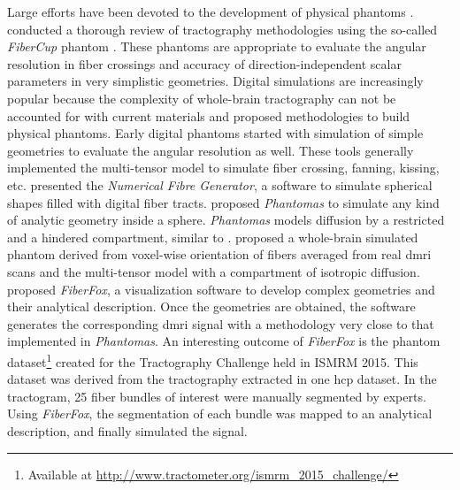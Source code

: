 \documentclass[english]{frontiers/frontiersSCNS} %
\begin{document}
Large efforts have been devoted to the development of physical phantoms
  \citep{lin_validation_2001,campbell_flowbased_2005,perrin_validation_2005,fieremans_simulation_2008,tournier_resolving_2008}.
\cite{cote_tractometer_2013} conducted a thorough review of tractography methodologies using the
  so-called \emph{FiberCup} phantom \citep{poupon_new_2008,fillard_quantitative_2011}.
These phantoms are appropriate to evaluate the angular resolution in fiber crossings and accuracy of
  direction-independent scalar parameters in very simplistic geometries.
Digital simulations are increasingly popular because the complexity of whole-brain tractography
  can not be accounted for with current materials and proposed methodologies to build physical phantoms.
Early digital phantoms started with simulation of simple geometries
  \citep{basser_in_2000,goessl_fiber_2002,tournier_limitations_2002,leemans_mathematical_2005}
  to evaluate the angular resolution as well.
These tools generally implemented the multi-tensor model \citep{alexander_analysis_2001,tuch_high_2002}
  to simulate fiber crossing, fanning, kissing, etc.
\cite{close_software_2009} presented the \emph{Numerical Fibre Generator}, a software to simulate
  spherical shapes filled with digital fiber tracts.
\cite{caruyer_phantomas_2014} proposed \emph{Phantomas} to simulate any kind of analytic geometry
  inside a sphere.
\emph{Phantomas} models diffusion by a restricted and a hindered compartment, similar to
  \citep{assaf_composite_2005}.
\cite{wilkins_fiber_2014} proposed a whole-brain simulated phantom derived from voxel-wise orientation
  of fibers averaged from real \gls*{dmri} scans and the multi-tensor model with a compartment of
  isotropic diffusion.
\cite{neher_fiberfox_2014} proposed \emph{FiberFox}, a visualization software to develop
  complex geometries and their analytical description.
Once the geometries are obtained, the software generates the corresponding \gls*{dmri} signal with a
  methodology very close to that implemented in \emph{Phantomas}.
An interesting outcome of \emph{FiberFox} is the phantom dataset\footnote{Available at
  \url{http://www.tractometer.org/ismrm_2015_challenge/}} created for the Tractography
  Challenge held in ISMRM 2015.
This dataset was derived from the tractography extracted in one \gls*{hcp} dataset.
In the tractogram, 25 fiber bundles of interest were manually segmented by experts.
Using \emph{FiberFox}, the segmentation of each bundle was mapped to an analytical
  description, and finally simulated the signal.
\end{document}
